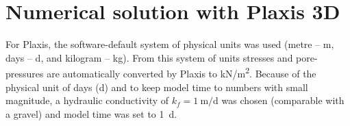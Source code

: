 

\section{Numerical solution with Plaxis 3D}

For Plaxis, the software-default system of physical units was used (metre --
\unit{\metre}, days -- \unit{\day}, and kilogram -- \unit{\kilogram}). From
this system of units stresses and pore-pressures are automatically converted by
Plaxis to \unit[per-mode = symbol]{\kilo\newton\per\square\metre}. Because of
the physical unit of days (\unit{\day}) and to keep model time to numbers with
small magnitude, a hydraulic conductivity of $k_f = \qty[per-mode =
        symbol]{1}{\metre\per\day}$ was chosen (comparable with a gravel) and model
time was set to \qty{1}{\day}.

